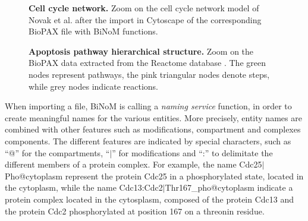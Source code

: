 \documentclass[10pt]{bmc_article}
\newenvironment{bmcformat}{\baselineskip20pt\sloppy\setboolean{publ}{false}}{\baselineskip20pt\sloppy}
\begin{document}
\begin{bmcformat}
\begin{figure}[h]
 \caption{\label{mphasebiopax}  \textbf{Cell cycle network.} Zoom on the cell
cycle network model of Novak et al. \cite{novak1998model} after the import in 
Cytoscape of the corresponding BioPAX file with BiNoM functions.}
\end{figure}

\begin{figure}[h]
 \caption{\label{apoptosishierarchical}  \textbf{Apoptosis pathway hierarchical
structure.} Zoom on the BioPAX data extracted from the Reactome database
\cite{joshi2005reactome}. The green nodes represent pathways, the pink
triangular nodes denote steps, while grey nodes indicate reactions.}
\end{figure}


When importing a file, BiNoM is calling a \emph{naming service} function, in
order to create meaningful names for the various entities. More precisely,
entity names are combined with other features such as modifications, compartment
and complexes components. The different features are indicated by special
characters, such as ``@'' for the compartments, ``$|$'' for modifications and
``:'' to delimitate the different members of a protein complex. For example, the
name Cdc25$|$Pho@cytoplasm represent the protein Cdc25 in a phosphorylated
state, located in the cytoplasm, while the name
Cdc13:Cdc2$|$Thr167\_pho@cytoplasm indicate a protein complex located in the
cytosplasm, composed of the protein Cdc13 and the protein Cdc2 phosphorylated at
position 167 on a threonin residue.



\end{bmcformat}
\end{document}
